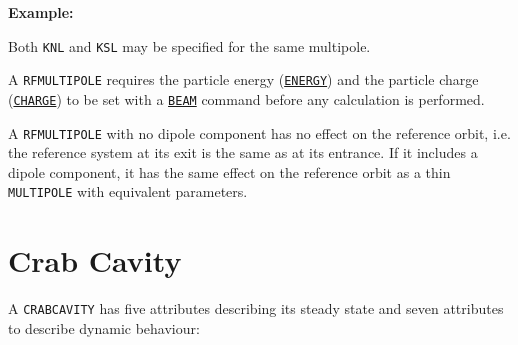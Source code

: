 \textbf{Example:}

Both \texttt{KNL} and \texttt{KSL} may be specified for the same multipole.  

A \texttt{RFMULTIPOLE} requires the particle energy
(\hyperref[sec:beam]{\texttt{ENERGY}}) and the particle charge
(\hyperref[sec:beam]{\texttt{CHARGE}}) to be set with a
\hyperref[sec:beam]{\texttt{BEAM}} command before any calculation is
performed.  


A \texttt{RFMULTIPOLE} with no dipole component has no effect on the reference
orbit, i.e. the reference system at its exit is the same as at its
entrance. If it includes a dipole component, it has the same effect on
the reference orbit as a thin \texttt{MULTIPOLE} with equivalent
parameters. 




\section{Crab Cavity}
\label{sec:crab-cavity}\label{sec:crabcavity}


A \texttt{CRABCAVITY} has five attributes describing its steady state 
and seven attributes to describe dynamic behaviour: 

